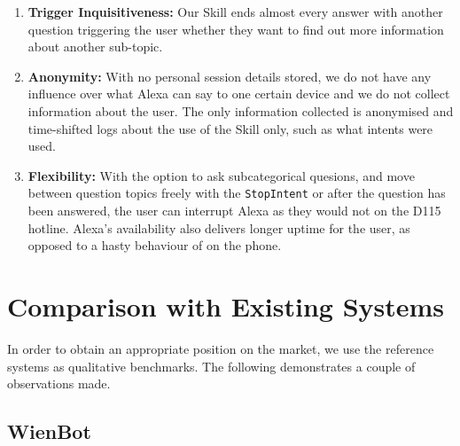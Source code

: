 \begin{enumerate}
	\item \textbf{Trigger Inquisitiveness: } Our Skill ends almost every answer with another question triggering the user whether they want to find out more information about another sub-topic.
	
	\item \textbf{Anonymity:} With no personal session details stored, we do not have any influence over what Alexa can say to one certain device and we do not collect information about the user. The only information collected is anonymised and time-shifted logs about the use of the Skill only, such as what intents were used. 
	\item \textbf{Flexibility: } With the option to ask subcategorical quesions, and move between question topics freely with the \texttt{StopIntent} or after the question has been answered, the user can interrupt Alexa as they would not on the D115 hotline. Alexa's availability also delivers longer uptime for the user, as opposed to a hasty behaviour of on the phone. %
	
	
	
\end{enumerate}





\section{Comparison with Existing Systems}

In order to obtain an appropriate position on the market, we use the reference systems as qualitative benchmarks. The following demonstrates a couple of observations made.

\subsection*{WienBot}


